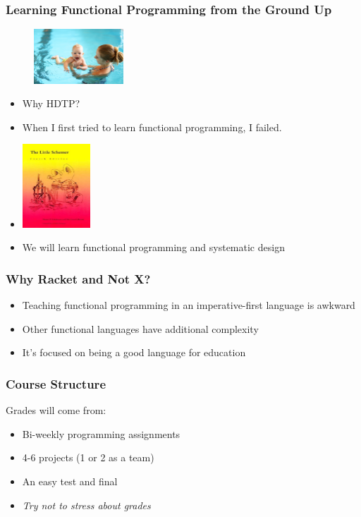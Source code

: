\documentclass{beamer}
\begin{document}
\begin{frame}
  \frametitle{Learning Functional Programming from the Ground Up}
  \begin{figure}[t]
    \centering \includegraphics[width=0.3\textwidth]{images/pool-baby.jpeg}
  \end{figure}
  \begin{itemize}
  \item<1-> Why HDTP?
  \item<2-> When I first tried to learn functional programming, I failed.
  \item<4-> \includegraphics[width=0.2\textwidth]{images/little-schemer.jpg}
  \item<5-> We will learn functional programming and systematic design
  \end{itemize}  
\end{frame}

\begin{frame}
  \frametitle{Why Racket and Not X?}
  \begin{itemize}
    \item<1-> Teaching functional programming in an imperative-first language is awkward
    \item<2-> Other functional languages have additional complexity
    \item<3-> It's focused on being a good language for education
  \end{itemize}
\end{frame}

\begin{frame}
  \frametitle{Course Structure}
  Grades will come from:
  \begin{itemize}
  \item<1-> Bi-weekly programming assignments
  \item<2-> 4-6 projects (1 or 2 as a team)    
  \item<3-> An easy test and final    
  \item<4-> \emph{Try not to stress about grades}
  \end{itemize}
\end{frame}
\end{document}
